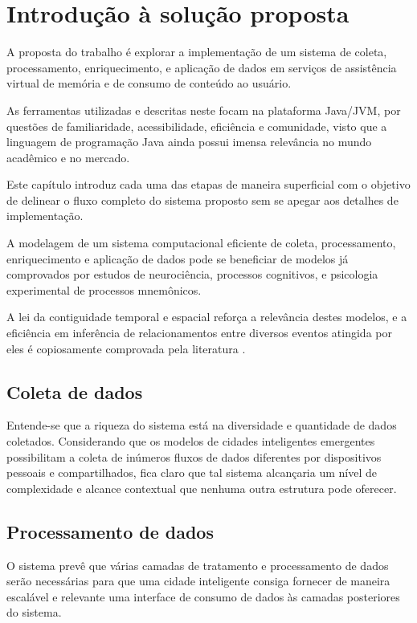 \chapter{Introdução à solução proposta} \label{c:introducao_a_solucao_proposta}

A proposta do trabalho é explorar a implementação de um sistema de coleta, processamento, enriquecimento, e aplicação de dados em serviços de assistência virtual de memória e de consumo de conteúdo ao usuário.

As ferramentas utilizadas e descritas neste focam na plataforma Java/JVM, por questões de familiaridade, acessibilidade, eficiência e comunidade, visto que a linguagem de programação Java ainda possui imensa relevância no mundo acadêmico e no mercado.

Este capítulo introduz cada uma das etapas de maneira superficial com o objetivo de delinear o fluxo completo do sistema proposto sem se apegar aos detalhes de implementação.

A modelagem de um sistema computacional eficiente de coleta, processamento, enriquecimento e aplicação de dados pode se beneficiar de modelos já comprovados por estudos de neurociência, processos cognitivos, e psicologia experimental de processos mnemônicos.

A lei da contiguidade temporal e espacial reforça a relevância destes modelos, e a eficiência em inferência de relacionamentos entre diversos eventos atingida por eles é copiosamente comprovada pela literatura \cite{Polyn2011SemanticCA}.

\section{Coleta de dados} \label{s:coleta_de_dados}

Entende-se que a riqueza do sistema está na diversidade e quantidade de dados coletados. Considerando que os modelos de cidades inteligentes emergentes possibilitam a coleta de inúmeros fluxos de dados diferentes por dispositivos pessoais e compartilhados, fica claro que tal sistema alcançaria um nível de complexidade e alcance contextual que nenhuma outra estrutura pode oferecer. 

\section{Processamento de dados} \label{s:processamento_de_dados}

O sistema prevê que várias camadas de tratamento e processamento de dados serão necessárias para que uma cidade inteligente consiga fornecer de maneira escalável e relevante uma interface de consumo de dados às camadas posteriores do sistema.

